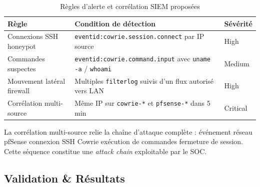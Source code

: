 \documentclass[12pt,a4paper,openany]{report}
\newcommand{\tableheadcolor}{\rowcolor{tableheadbg}}
\begin{document}
	\begin{table}[H]
		\centering
		\small
		\renewcommand{\arraystretch}{1.25}
		\begin{tabular}{p{3.8cm} p{4.6cm} p{3.5cm}}
			\arrayrulecolor{tableborder}
			\hline
			\tableheadcolor
			\textcolor{tableheadfg}{\textbf{Règle}} &
			\textcolor{tableheadfg}{\textbf{Condition de détection}} &
			\textcolor{tableheadfg}{\textbf{Sévérité}} \\
			\hline
			\rowcolor{tablerowalt}
			Connexions SSH honeypot & \texttt{eventid:cowrie.session.connect} par IP source & High \\
			Commandes suspectes & \texttt{eventid:cowrie.command.input} avec \texttt{uname -a} / \texttt{whoami} & Medium \\
			\rowcolor{tablerowalt}
			Mouvement latéral firewall & Multiples \texttt{filterlog} suivis d'un flux autorisé vers LAN & High \\
			Corrélation multi-source & Même IP sur \texttt{cowrie-*} et \texttt{pfsense-*} dans 5 min & Critical \\
			\hline
		\end{tabular}
		\caption{Règles d'alerte et corrélation SIEM proposées}
		\label{tab:elk-alert-rules}
	\end{table}
	
	La corrélation multi-source relie la chaîne d'attaque complète : événement réseau pfSense \rightarrow connexion SSH Cowrie \rightarrow exécution de commandes \rightarrow fermeture de session. Cette séquence constitue une \textit{attack chain} exploitable par le SOC.
	
	\subsection{Validation \& Résultats}
	\label{sec:elk-validation}
	
\end{document}
